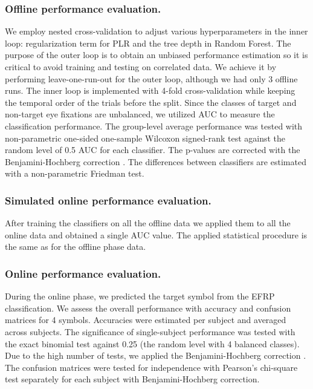 \documentclass[12pt]{iopart}
\begin{document}
\subsubsection*{Offline performance evaluation.}
We employ nested cross-validation to adjust various hyperparameters in the inner loop:
regularization term for PLR and the tree depth in Random Forest.
The purpose of the outer loop is to obtain an unbiased performance estimation
so it is critical to avoid training and testing on correlated data.
We achieve it by performing leave-one-run-out for the outer loop,
although we had only 3 offline runs.
The inner loop is implemented with 4-fold cross-validation while keeping
the temporal order of the trials before the split.
Since the classes of target and non-target eye fixations are unbalanced,
we utilized AUC to measure the classification performance.
The group-level average performance was tested with non-parametric one-sided one-sample Wilcoxon signed-rank test against the random level of 0.5 AUC for each classifier.
The p-values are corrected with 
the Benjamini-Hochberg correction \cite{benjamini_controlling_1995}.
The differences between classifiers are estimated with a non-parametric Friedman test.

\subsubsection*{Simulated online performance evaluation.}
After training the classifiers on all the offline data we applied them 
to all the online data and obtained a single AUC value.
The applied statistical procedure is the same as for the offline phase data.

\subsubsection*{Online performance evaluation.}
During the online phase, we predicted the target symbol from the EFRP classification.
We assess the overall performance with accuracy and confusion matrices
for 4 symbols. Accuracies were estimated per subject and averaged across subjects.
The significance of single-subject performance was tested with the exact binomial test against
0.25 (the random level with 4 balanced classes). Due to the high number of tests,
we applied the Benjamini-Hochberg correction \cite{benjamini_controlling_1995}.
The confusion matrices were tested for independence
with Pearson's chi-square test \cite{frs_x_1900} separately for each subject 
with Benjamini-Hochberg correction.
\end{document}
